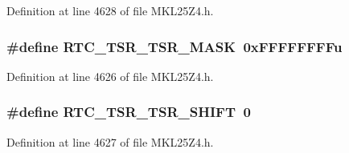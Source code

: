 Definition at line 4628 of file M\+K\+L25\+Z4.\+h.

\subsubsection[{\texorpdfstring{R\+T\+C\+\_\+\+T\+S\+R\+\_\+\+T\+S\+R\+\_\+\+M\+A\+SK}{RTC_TSR_TSR_MASK}}]{\setlength{\rightskip}{0pt plus 5cm}\#define R\+T\+C\+\_\+\+T\+S\+R\+\_\+\+T\+S\+R\+\_\+\+M\+A\+SK~0x\+F\+F\+F\+F\+F\+F\+F\+Fu}\hypertarget{group___r_t_c___register___masks_ga9a0f8842e8262ca176fcf028982153af}{}\label{group___r_t_c___register___masks_ga9a0f8842e8262ca176fcf028982153af}


Definition at line 4626 of file M\+K\+L25\+Z4.\+h.

\subsubsection[{\texorpdfstring{R\+T\+C\+\_\+\+T\+S\+R\+\_\+\+T\+S\+R\+\_\+\+S\+H\+I\+FT}{RTC_TSR_TSR_SHIFT}}]{\setlength{\rightskip}{0pt plus 5cm}\#define R\+T\+C\+\_\+\+T\+S\+R\+\_\+\+T\+S\+R\+\_\+\+S\+H\+I\+FT~0}\hypertarget{group___r_t_c___register___masks_gad0476d1e39a866b5b5ba4728b55e258a}{}\label{group___r_t_c___register___masks_gad0476d1e39a866b5b5ba4728b55e258a}


Definition at line 4627 of file M\+K\+L25\+Z4.\+h.

